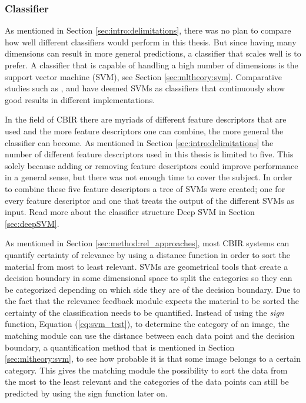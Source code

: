 \subsubsection{Classifier}
\label{sec:method:proposed:matching:classifier}
As mentioned in Section \ref{sec:intro:delimitations}, there was no plan to compare how well different classifiers would perform in this thesis. 
But since having many dimensions can result in more general predictions, a classifier that scales well is to prefer. A classifier that is capable of handling a high number of dimensions is the support vector machine (SVM), see Section \ref{sec:mltheory:svm}. 
Comparative studies such as \cite{IRJET2017classificationMethods}, \cite{SMMR2016comparisionClassificationMethods} and \cite{Informatica2007revClassification} have deemed SVMs as classifiers that continuously show good results in different implementations. 

In the field of CBIR there are myriads of different feature descriptors that are used and the more feature descriptors one can combine, the more general the classifier can become. As mentioned in Section \ref{sec:intro:delimitations} the number of different feature descriptors used in this thesis is limited to five. This solely because adding or removing feature descriptors could improve performance in a general sense, but there was not enough time to cover the subject. In order to combine these five feature descriptors a tree of SVMs were created; one for every feature descriptor and one that treats the output of the different SVMs as input. Read more about the classifier structure Deep SVM in Section \ref{sec:deepSVM}. 

As mentioned in Section \ref{sec:method:rel_approaches}, most CBIR systems can quantify certainty of relevance by using a distance function in order to sort the material from most to least relevant. SVMs are geometrical tools that create a decision boundary in some dimensional space to split the categories so they can be categorized depending on which side they are of the decision boundary. Due to the fact that the relevance feedback module expects the material to be sorted the certainty of the classification needs to be quantified. Instead of using the \emph{sign} function, Equation (\ref{eq:svm_test}), to determine the category of an image, the matching module can use the distance between each data point and the decision boundary, a quantification method that is mentioned in Section \ref{sec:mltheory:svm}, to see how probable it is that some image belongs to a certain category. This gives the matching module the possibility to sort the data from the most to the least relevant and the categories of the data points can still be predicted by using the sign function later on.


